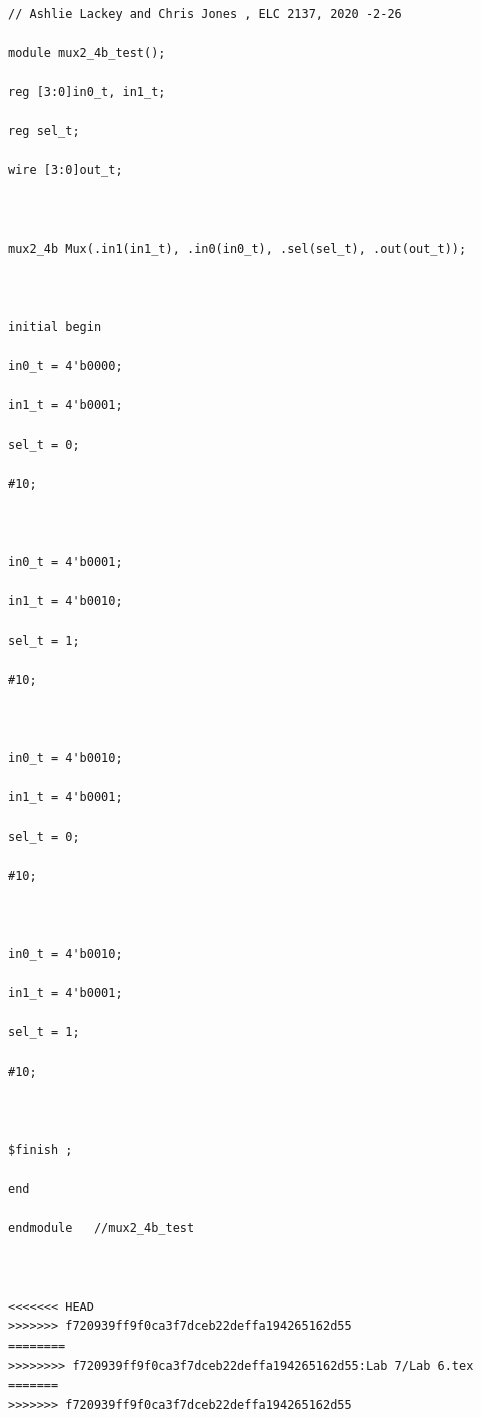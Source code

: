 \documentclass[11pt]{article}
\begin{document}
\begin{lstlisting}[style=Verilog,caption=MUX Testbench Code,label=code:ex ]

// Ashlie Lackey and Chris Jones , ELC 2137, 2020 -2-26

module mux2_4b_test();

reg [3:0]in0_t, in1_t;

reg sel_t;

wire [3:0]out_t;



mux2_4b Mux(.in1(in1_t), .in0(in0_t), .sel(sel_t), .out(out_t));



initial begin

in0_t = 4'b0000;

in1_t = 4'b0001;

sel_t = 0;

#10;



in0_t = 4'b0001;

in1_t = 4'b0010;

sel_t = 1;

#10;



in0_t = 4'b0010;

in1_t = 4'b0001;

sel_t = 0;

#10;



in0_t = 4'b0010;

in1_t = 4'b0001;

sel_t = 1;

#10;



$finish ;

end

endmodule   //mux2_4b_test



<<<<<<< HEAD
>>>>>>> f720939ff9f0ca3f7dceb22deffa194265162d55
========
>>>>>>>> f720939ff9f0ca3f7dceb22deffa194265162d55:Lab 7/Lab 6.tex
=======
>>>>>>> f720939ff9f0ca3f7dceb22deffa194265162d55
\end{lstlisting}
\end{document}
